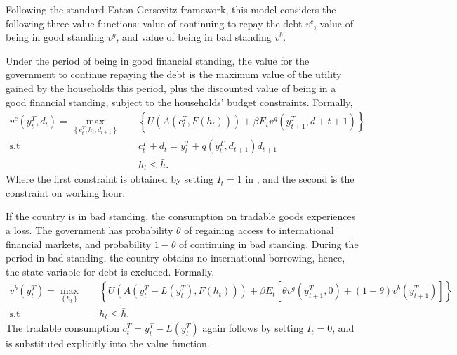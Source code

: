 Following the standard Eaton-Gersovitz framework, this model considers the following three value functions:
value of continuing to repay the debt $v^c$, value of being in good standing $v^g$, and value of being in bad standing $v^b$.

Under the period of being in good financial standing, the value for the government to continue repaying the debt is the maximum value of the utility gained by the households this period, plus the discounted value of being in a good financial standing, subject to the households' budget constraints. Formally,
\begin{equation}
    \begin{aligned}
        v^c(y^T_t, d_t) = \max_{\left\{ c^T_t, h_t, d_{t+1} \right\}} \quad
        &\left\{
            U\left(
                A\left(c^T_t, F(h_t)\right)
             \right)
             + \beta E_t
             v^g \left(
                y^T_{t+1}, d+{t+1}
              \right)
         \right\}\\
          \text{s.t} \quad& c^T_t + d_t = y^T_t + q(y^T_t, d_{t+1}) d_{t+1} \\
                    & h_t \le \bar{h}.
    \end{aligned}
\end{equation}
Where the first constraint is obtained by setting $I_t = 1$ in , and the second is the constraint on working hour.

If the country is in bad standing, the consumption on tradable goods experiences a loss. The government has probability $\theta$ of regaining access to international financial markets, and probability $1 - \theta$ of continuing in bad standing. During the period in bad standing, the country obtains no international borrowing, hence, the state variable for debt is excluded. Formally,
\begin{equation}
    \begin{aligned}
        v^b(y^T_t) = \max_{\left\{ h_t \right\}} \quad
        &\left\{
            U\left(
                A\left( y^T_t - L(y^T_t), F(h_t)\right)
             \right)
             + \beta E_t \left[
                \theta v^g \left(
                    y^T_{t+1}, 0
                \right)
                + (1-\theta) v^b \left(
                    y^{T}_{t+1}
                 \right)
            \right]
         \right\}\\
          \text{s.t} \quad& h_t \le \bar{h}.
    \end{aligned}
\end{equation}
The tradable consumption $c^T_t = y^T_t - L(y^T_t)$ again follows  by setting $I_t = 0$, and is substituted explicitly into the value function.

